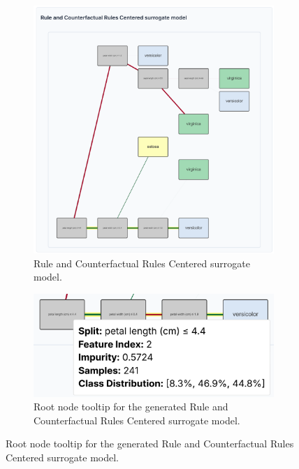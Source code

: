 \begin{figure}
    \centering
    \begin{subfigure}[c]{0.65\textwidth}
        \includegraphics[width=\textwidth]{images/teaching_blocks_initial.png}
        \caption{Rule and Counterfactual Rules Centered surrogate model.}
        \label{fig:teaching_blocks_initial}
    \end{subfigure}
    \hfill
    \begin{subfigure}[c]{0.33\textwidth}
        \includegraphics[width=\textwidth]{images/teaching_blocks_root_tooltip.png}
        \caption{Root node tooltip for the generated Rule and Counterfactual Rules Centered surrogate model.}
        \label{fig:teaching_blocks_root_tooltip}

\end{subfigure}
\end{figure}
